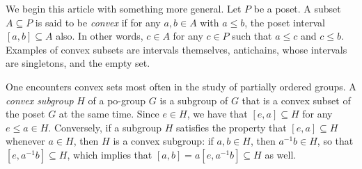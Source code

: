 \documentclass[12pt]{article}
\begin{document}
We begin this article with something more general.  Let $P$ be a poset.  A subset $A\subseteq P$ is said to be \emph{convex} if for any $a,b\in A$ with $a\le b$, the poset interval $[a,b]\subseteq A$ also.  In other words, $c\in A$ for any $c\in P$ such that $a\le c$ and $c\le b$.  Examples of convex subsets are intervals themselves, antichains, whose intervals are singletons, and the empty set.

One encounters convex sets most often in the study of partially ordered groups.  A \emph{convex subgroup} $H$ of a po-group $G$ is a subgroup of $G$ that is a convex subset of the poset $G$ at the same time.  Since $e\in H$, we have that $[e,a]\subseteq H$ for any $e\le a\in H$.  Conversely, if a subgroup $H$ satisfies the property that $[e,a]\subseteq H$ whenever $a\in H$, then $H$ is a convex subgroup: if $a,b\in H$, then $a^{-1}b\in H$, so that $[e,a^{-1}b]\subseteq H$, which implies that $[a,b]=a[e,a^{-1}b]\subseteq H$ as well.
\end{document}
